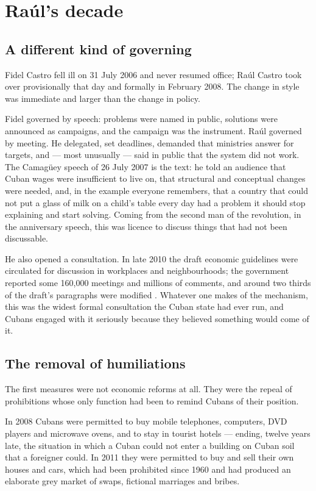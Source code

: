\chapter{Ra\'ul's decade}
\label{ch:raul}

\section{A different kind of governing}

Fidel Castro fell ill on 31 July 2006 and never resumed office; Ra\'ul Castro
took over provisionally that day and formally in February 2008. The change in
style was immediate and larger than the change in policy.

Fidel governed by speech: problems were named in public, solutions were
announced as campaigns, and the campaign was the instrument. Ra\'ul governed by
meeting. He delegated, set deadlines, demanded that ministries answer for
targets, and --- most unusually --- said in public that the system did not work.
The Camag\"uey speech of 26 July 2007 is the text: he told an audience that
Cuban wages were insufficient to live on, that structural and conceptual changes
were needed, and, in the example everyone remembers, that a country that could
not put a glass of milk on a child's table every day had a problem it should
stop explaining and start solving. Coming from the second man of the revolution,
in the anniversary speech, this was licence to discuss things that had not been
discussable.

He also opened a consultation. In late 2010 the draft economic guidelines were
circulated for discussion in workplaces and neighbourhoods; the government
reported some 160,000 meetings and millions of comments, and around two thirds
of the draft's paragraphs were modified \citep{mesalago2013}.\unv{} Whatever one makes of the
mechanism, this was the widest formal consultation the Cuban state had ever run,
and Cubans engaged with it seriously because they believed something would come
of it.

\section{The removal of humiliations}

The first measures were not economic reforms at all. They were the repeal of
prohibitions whose only function had been to remind Cubans of their position.

In 2008 Cubans were permitted to buy mobile telephones, computers, DVD players
and microwave ovens, and to stay in tourist hotels --- ending, twelve years
late, the situation in which a Cuban could not enter a building on Cuban soil
that a foreigner could. In 2011 they were permitted to buy and sell their own
houses and cars, which had been prohibited since 1960 and had produced an
elaborate grey market of swaps, fictional marriages and bribes.

